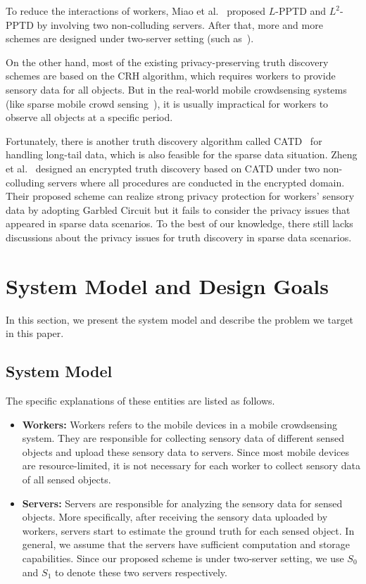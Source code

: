 \documentclass[conference]{IEEEtran}
\begin{document}
To reduce the interactions of workers, Miao et al.~\cite{miao_lightweight_2017} proposed $L$-PPTD and $L^2$-PPTD by involving two non-colluding servers.
After that, more and more schemes are designed under two-server setting (such as~\cite{zhang_lptd_2019,zhang_reliable_2019,xue_inpptd_2020,tang_achieving_2021}).

On the other hand, most of the existing privacy-preserving truth discovery schemes are based on the CRH algorithm, which requires workers to provide sensory data for all objects.
But in the real-world mobile crowdsensing systems (like sparse mobile crowd sensing~\cite{wang_sparse_2016}), it is usually impractical for workers to observe all objects at a specific period.

Fortunately, there is another truth discovery algorithm called CATD~\cite{li_confidence-aware_2014} for handling long-tail data, which is also feasible for the sparse data situation.
Zheng et al.~\cite{zheng_learning_2018} designed an encrypted truth discovery based on CATD under two non-colluding servers where all procedures are conducted in the encrypted domain.
Their proposed scheme can realize strong privacy protection for workers' sensory data by adopting Garbled Circuit but it fails to consider the privacy issues that appeared in sparse data scenarios.
To the best of our knowledge, there still lacks discussions about the privacy issues for truth discovery in sparse data scenarios.

\section{System Model and Design Goals}\label{sec3}
In this section, we present the system model and describe the problem we target in this paper.
\subsection{System Model}\label{sec3-A}
The specific explanations of these entities are listed as follows.

\begin{itemize}
  \item \textbf{Workers:} Workers refers to the mobile devices in a mobile crowdsensing system. They are responsible for collecting sensory data of different sensed objects and upload these sensory data to servers. Since most mobile devices are resource-limited, it is not necessary for each worker to collect sensory data of all sensed objects.
  \item \textbf{Servers:} Servers are responsible for analyzing the sensory data for sensed objects. More specifically, after receiving the sensory data uploaded by workers, servers start to estimate the ground truth for each sensed object. In general, we assume that the servers have sufficient computation and storage capabilities. Since our proposed scheme is under two-server setting, we use $S_0$ and $S_1$ to denote these two servers respectively.
\end{itemize}
\end{document}
